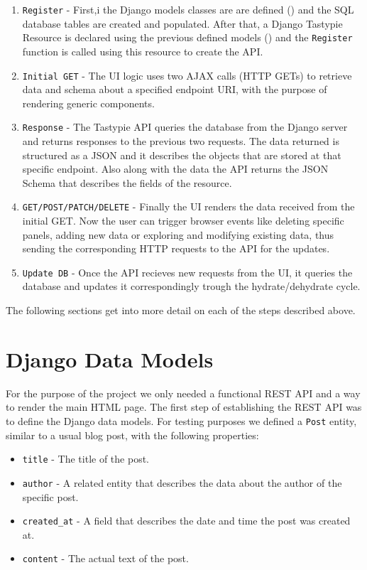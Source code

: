 \begin{enumerate}
	\item \texttt{Register} - First,i the Django models classes are are defined () and the SQL database tables are created and populated. After that, a Django Tastypie Resource is declared using the previous defined models () and the \texttt{Register} function is called using this resource to create the API.
	\item \texttt{Initial GET} - The UI logic uses two AJAX calls (HTTP GETs) to retrieve data and schema about a specified endpoint URI, with the purpose of rendering generic components.
	\item \texttt{Response} - The Tastypie API queries the database from the Django server and returns responses to the previous two requests. The data returned is structured as a JSON and it describes the objects that are stored at that specific endpoint. Also along with the data the API returns the JSON Schema that describes the fields of the resource.
	\item \texttt{GET/POST/PATCH/DELETE} - Finally the UI renders the data received from the initial GET. Now the user can trigger browser events like deleting specific panels, adding new data or exploring and modifying existing data, thus sending the corresponding HTTP requests to the API for the updates.
	\item \texttt{Update DB} - Once the API recieves new requests from the UI, it queries the database and updates it correspondingly trough the hydrate/dehydrate cycle.
	
\end{enumerate}

The following sections get into more detail on each of the steps described above.

\section{Django Data Models}
\label{sec:django-models}

For the purpose of the project we only needed a functional REST API and a way to render the main HTML page. The first step of establishing the REST API was to define the Django data models. For testing purposes we defined a \texttt{Post} entity, similar to a usual blog post, with the following properties:

\begin{itemize}
	\item \texttt{title} - The title of the post.
	\item \texttt{author} - A related entity that describes the data about the author of the specific post.
	\item \texttt{created\_at} - A field that describes the date and time the post was created at.
	\item \texttt{content} - The actual text of the post.
\end{itemize}

